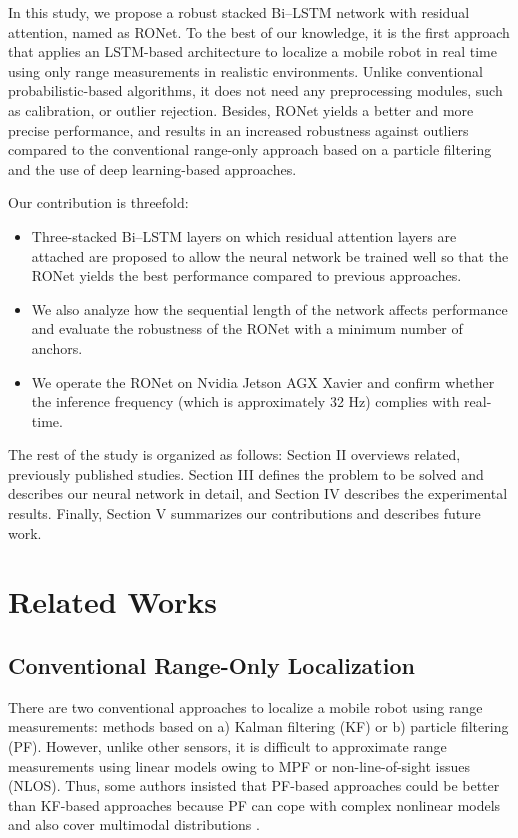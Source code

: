 \documentclass[letterpaper, 10 pt, conference]{ieeeconf}
\begin{document}
In this study, we propose a robust stacked Bi--LSTM network with residual attention, named as RONet. To the best of our knowledge, it is the first approach that applies an LSTM-based architecture to localize a mobile robot in real time using only range measurements in realistic environments. Unlike conventional probabilistic-based algorithms, it does not need any preprocessing modules, such as calibration, or outlier rejection. Besides, RONet yields a better and more precise performance, and results in an increased robustness against outliers compared to the conventional range-only approach based on a particle filtering and the use of deep learning-based approaches.

Our contribution is threefold:
\begin{itemize}
	\item Three-stacked Bi--LSTM layers on which residual attention layers are attached are proposed to allow the neural network be trained well so that the RONet yields the best performance compared to previous approaches.
	\item We also analyze how the sequential length of the network affects performance and evaluate the robustness of the RONet with a minimum number of anchors.
	\item We operate the RONet on Nvidia Jetson AGX Xavier and confirm whether the inference frequency (which is approximately 32 Hz) complies with real-time. 
\end{itemize}

The rest of the study is organized as follows: Section II overviews related, previously published studies. Section III defines the problem to be solved and describes our neural network in detail, and Section IV describes the experimental results. Finally, Section V summarizes our contributions and describes future work.

\section{Related Works}
\subsection{Conventional Range-Only Localization}

There are two conventional approaches to localize a mobile robot using range measurements: methods based on a) Kalman filtering (KF) or b) particle filtering (PF). However, unlike other sensors, it is difficult to approximate range measurements using linear models owing to MPF or non-line-of-sight issues (NLOS). Thus, some authors insisted that PF-based approaches could be better than KF-based approaches because PF can cope with complex nonlinear models and also cover multimodal distributions \cite{gonzalez2009mobile, blanco2008pure, shetty2018particle}. 
\end{document}
